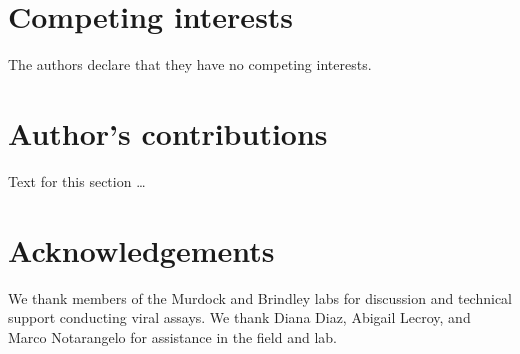 \documentclass{bmcart}
\begin{document}
\begin{backmatter}

\section*{Competing interests}
  The authors declare that they have no competing interests.

\section*{Author's contributions}
    Text for this section \ldots

\section*{Acknowledgements}
We thank members of the Murdock and Brindley labs for discussion and technical support conducting viral assays. We thank Diana Diaz, Abigail Lecroy, and Marco Notarangelo for assistance in the field and lab.




\end{backmatter}
\end{document}
